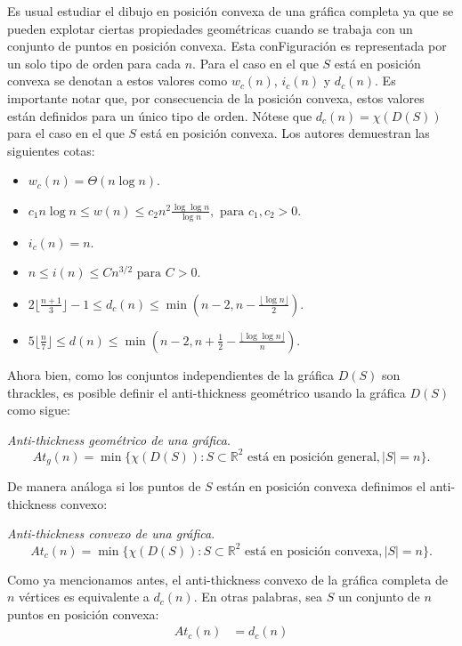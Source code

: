 Es usual estudiar el dibujo en posición convexa de una gráfica completa ya que
se pueden explotar ciertas propiedades geométricas cuando se trabaja con un
conjunto de puntos en posición convexa. Esta conFiguración es representada por
un solo tipo de orden para cada $n$. Para el caso en el que $S$ está en
posición convexa se denotan a estos valores como $w_c(n)$, $i_c(n)$ y $d_c(n)$.
Es importante notar que, por consecuencia de la posición convexa, estos valores
están definidos para un único tipo de orden. Nótese que $d_c(n)=\chi(D(S))$ para
el caso en el que $S$ está en posición convexa. Los autores demuestran las siguientes cotas:
\begin{itemize}
  \item $w_c(n) = \Theta(n\log n)$.
  \item $c_1n\log n \leq w(n) \leq c_2 n^2 \frac{\log\log n}{\log n}, \text{ para } c_1,c_2 > 0$.
  \item $i_c(n) = n$.
  \item $n \leq i(n) \leq Cn^{3/2} \text{ para } C > 0$.
  \item $2\lfloor \frac{n+1}{3}\rfloor -1 \leq d_c(n) \leq \min\left( n-2, n - \frac{\lfloor{\log n}\rfloor}{2}\right)$.
  \item $5\lfloor \frac{n}{7}\rfloor \leq d(n) \leq \min\left(n-2,n+\frac{1}{2}- \frac{\lfloor{\log \log n}\rfloor}{n}\right)$.
\end{itemize}

Ahora bien, como los conjuntos independientes de la gráfica $D(S)$ son
thrackles, es posible definir el anti-thickness geométrico usando la gráfica
$D(S)$ como sigue:
\begin{definition}{\emph{Anti-thickness geométrico de una gráfica}.}
  \[At_g(n) = \min\{\chi(D(S)): S\subset \mathbb{R}^2 \text{ está en posición general}, |S|=n\}.\]
\end{definition}

De manera análoga si los puntos de $S$ están en posición convexa definimos el
anti-thickness convexo:

\begin{definition}{\emph{Anti-thickness convexo de una gráfica}.}
  \[At_c(n) = \min\{\chi(D(S)): S\subset \mathbb{R}^2 \text{ está en posición convexa}, |S|=n\}.\]
\end{definition}

Como ya mencionamos antes, el anti-thickness convexo de la gráfica completa de $n$ vértices es equivalente a $d_c(n)$. En otras palabras, sea $S$ un conjunto
de $n$ puntos en posición convexa:
\begin{align*}
  At_c(n) &= d_c(n)
\end{align*}

